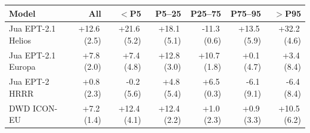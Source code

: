 \begin{tabular}{@{}lrrrrrr@{}}
\toprule
Model & All & $<$P5 & P5--25 & P25--75 & P75--95 & $>$P95 \\
\midrule
Jua EPT-2.1 Helios & +12.6\,(2.5) & +21.6\,(5.2) & +18.1\,(5.1) & -11.3\,(0.6) & +13.5\,(5.9) & +32.2\,(4.6) \\\addlinespace[0.35em]
Jua EPT-2.1 Europa & +7.8\,(2.0) & +7.4\,(4.8) & +12.8\,(3.0) & +10.7\,(1.8) & +0.1\,(4.7) & +3.4\,(8.4) \\\addlinespace[0.35em]
Jua EPT-2 HRRR & +0.8\,(2.3) & -0.2\,(5.6) & +4.8\,(5.4) & +6.5\,(0.3) & -6.1\,(9.1) & -6.4\,(8.4) \\\addlinespace[0.35em]
DWD ICON-EU & +7.2\,(1.4) & +12.4\,(4.1) & +12.4\,(2.2) & +1.0\,(2.3) & +0.9\,(3.3) & +10.5\,(6.2) \\
\bottomrule
\end{tabular}
